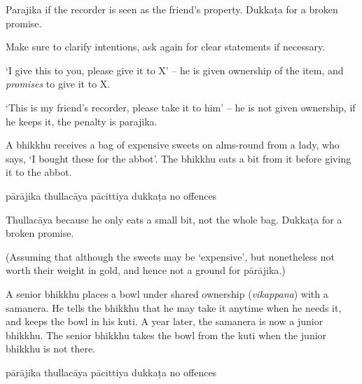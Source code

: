 \begin{exam}{\autoExamName}
\begin{problem*}
\begin{parts}
  \begin{solution}
    Parajika if the recorder is seen as the friend's property.
    Dukkaṭa for a broken promise.

    Make sure to clarify intentions, ask again for
    clear statements if necessary.

    `I give this to you, please give it to X' -- he is given ownership of the
    item, and \emph{promises} to give it to X.

    `This is my friend's recorder, please take it to him' -- he is not given
    ownership, if he keeps it, the penalty is parajika.
  \end{solution}

  \bigskip

  \item A bhikkhu receives a bag of expensive sweets on alms-round from a lady, who
  says, `I bought these for the abbot'. The bhikkhu eats a bit from it before giving it
  to the abbot.

  \bigskip

  \begin{answers}{5}
    \bChoices
     pārājika\eAns
     thullacāya\eAns
     pācittiya\eAns
     dukkaṭa\eAns
     no offences\eAns
    \eChoices
  \end{answers}

  \begin{solution}
    Thullacāya because he only eats a small bit, not the whole bag.
    Dukkaṭa for a broken promise.

    (Assuming that although the sweets may be `expensive',
    but nonetheless not worth their weight in gold,
    and hence not a ground for pārājika.)
  \end{solution}

  \bigskip

  \item A senior bhikkhu places a bowl under shared ownership (\emph{vikappana}) with a samanera.
  He tells the bhikkhu that he may take it anytime when he needs it, and keeps the bowl in his kuti.
  A year later, the samanera is now a junior bhikkhu.
  The senior bhikkhu takes the bowl from the kuti when the junior bhikkhu is not there.

  \bigskip

  \begin{answers}{5}
    \bChoices
     pārājika\eAns
     thullacāya\eAns
     pācittiya\eAns
     dukkaṭa\eAns
     no offences\eAns
    \eChoices
  \end{answers}


\end{parts}
\end{problem*}
\end{exam}

